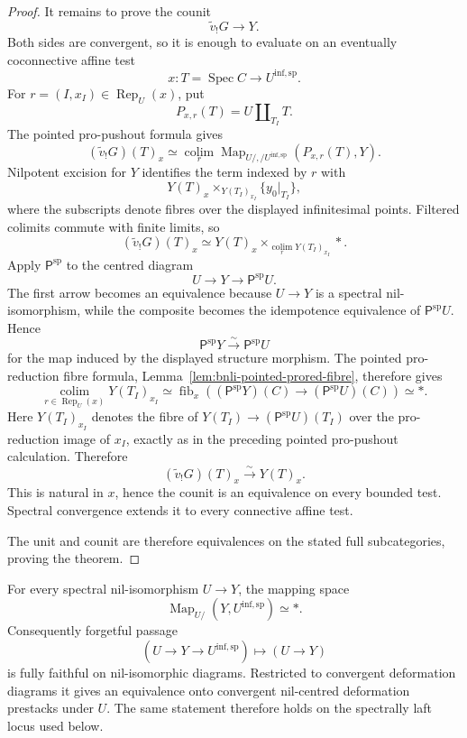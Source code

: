 \begin{proof}
It remains to prove the counit
\[
    \widetilde v_!G\longrightarrow Y.
\]
Both sides are convergent, so it is enough to evaluate on an eventually
coconnective affine test
\[
    x:T=\operatorname{Spec}C
    \longrightarrow U^{\mathrm{inf,sp}}.
\]
For
$r=(I,x_I)\in\operatorname{Rep}_{U}(x)$, put
\[
    P_{x,r}(T)=U\amalg_{T_I}T.
\]
The pointed pro-pushout formula gives
\[
    \left(
      \widetilde v_!G
    \right)(T)_x
    \simeq
    \operatorname*{colim}_{r}
    \operatorname{Map}_{U/,/U^{\mathrm{inf,sp}}}
    (P_{x,r}(T),Y).
\]
Nilpotent excision for $Y$ identifies the term indexed by $r$ with
\[
    Y(T)_x
    \times_{Y(T_I)_{x_I}}
    \{y_0|_{T_I}\},
\]
where the subscripts denote fibres over the displayed infinitesimal points.
Filtered colimits commute with finite limits, so
\[
    \left(
      \widetilde v_!G
    \right)(T)_x
    \simeq
    Y(T)_x
    \times_{
      \operatorname*{colim}_{r}Y(T_I)_{x_I}
    }
    *.
\]
Apply $\mathsf P^{\mathrm{sp}}$ to the centred diagram
\[
    U\longrightarrow Y\longrightarrow\mathsf P^{\mathrm{sp}}U.
\]
The first arrow becomes an equivalence because $U\to Y$ is a spectral
nil-isomorphism, while the composite becomes the idempotence equivalence of
$\mathsf P^{\mathrm{sp}}U$.  Hence
\[
\boxed{
    \mathsf P^{\mathrm{sp}}Y
    \xrightarrow{\sim}
    \mathsf P^{\mathrm{sp}}U}
\]
for the map induced by the displayed structure morphism.  The pointed
pro-reduction fibre formula,
Lemma~\ref{lem:bnli-pointed-prored-fibre}, therefore gives
\[
\boxed{
    \operatorname*{colim}_{r\in\operatorname{Rep}_U(x)}
    Y(T_I)_{x_I}
    \simeq
    \operatorname{fib}_{x}
    \left(
      (\mathsf P^{\mathrm{sp}}Y)(C)
      \to
      (\mathsf P^{\mathrm{sp}}U)(C)
    \right)
    \simeq *.}
\]
Here $Y(T_I)_{x_I}$ denotes the fibre of
$Y(T_I)\to(\mathsf P^{\mathrm{sp}}U)(T_I)$ over the pro-reduction image of
$x_I$, exactly as in the preceding pointed pro-pushout calculation.  Therefore
\[
    \left(
      \widetilde v_!G
    \right)(T)_x
    \xrightarrow{\sim}
    Y(T)_x.
\]
This is natural in $x$, hence the counit is an equivalence on every bounded
test.  Spectral convergence extends it to every connective affine test.

The unit and counit are therefore equivalences on the stated full
subcategories, proving the theorem.
\end{proof}

\begin{proposition}
\label{prop:bnli-forget-inf-target}
For every spectral nil-isomorphism $U\to Y$, the mapping space
\[
\boxed{
    \operatorname{Map}_{U/}
    (Y,U^{\mathrm{inf,sp}})
    \simeq *.}
\]
Consequently forgetful passage
\[
    (U\to Y\to U^{\mathrm{inf,sp}})
    \longmapsto
    (U\to Y)
\]
is fully faithful on nil-isomorphic diagrams.  Restricted to convergent
deformation diagrams it gives an equivalence onto convergent nil-centred
deformation prestacks under $U$.  The same statement therefore holds on the
spectrally laft locus used below.
\end{proposition}

